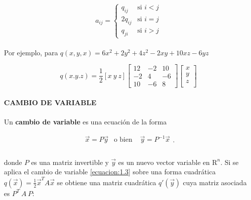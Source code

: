 \begin{equation}
a_{ij} = \left \{ 
    \begin{matrix} 
    q_{ij} & \mbox{si } i < j\\
    2q_{ij} & \mbox{si } i = j\\ 
    q_{ji} & \mbox{si } i > j
    \end{matrix}\right.
    \label{ecuacion:1.2}
\end{equation}

\paragraph*{}
Por ejemplo, para $q(x, y, x) = 6x^{2} + 2y^{2} + 4z^{2} - 2xy + 10xz - 6yz$

\begin{equation*}
q(x. y. z) = \frac{1}{2}\left[x ~  y ~ z\right] 
\begin{bmatrix}
12 & -2 & 10\\
-2 & 4 & -6\\
10 & -6 & 8
\end{bmatrix}
\begin{bmatrix}
x\\
y\\
z\\
\end{bmatrix}
\end{equation*}

\paragraph*{}
\textbf{CAMBIO DE VARIABLE}

\paragraph*{}
Un \textbf{cambio de variable} es una ecuación de la forma

\begin{equation}
    \begin{matrix} 
    \overrightarrow{x} = P\overrightarrow{y} & \mbox{o bien } & \overrightarrow{y} = P^{-1}\overrightarrow{x}\\
    \end{matrix}.
    \label{ecuacion:1.3}
\end{equation}

\paragraph*{}
donde $P$ es una matriz invertible y $\overrightarrow{y}$ es un nuevo vector variable en $\mathrm{R}^{n}$. Si se aplica el cambio de variable \ref{ecuacion:1.3} sobre una forma cuadrática $q(\overrightarrow{x}) = \frac{1}{2}\overrightarrow{x}^{T}A\overrightarrow{x}$ se obtiene una matriz cuadrática $q'(\overrightarrow{y})$ cuya matriz asociada es $P^{T} ~ A ~ P$:

